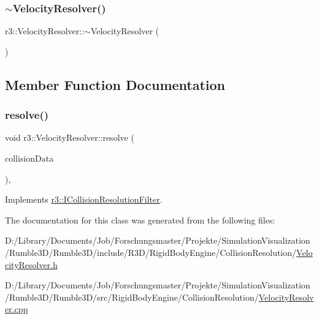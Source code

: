 \subsubsection{\texorpdfstring{$\sim$\+Velocity\+Resolver()}{~VelocityResolver()}}
{\footnotesize\ttfamily r3\+::\+Velocity\+Resolver\+::$\sim$\+Velocity\+Resolver (\begin{DoxyParamCaption}{ }\end{DoxyParamCaption})\hspace{0.3cm}{\ttfamily [default]}}



\subsection{Member Function Documentation}
\mbox{\label{classr3_1_1_velocity_resolver_ad3fa33c02dfa07c760ca9bc5c89f49c3}} 
\subsubsection{\texorpdfstring{resolve()}{resolve()}}
{\footnotesize\ttfamily void r3\+::\+Velocity\+Resolver\+::resolve (\begin{DoxyParamCaption}\item[{const \mbox{\hyperlink{classr3_1_1_collision_data}{Collision\+Data}} \&}]{collision\+Data }\end{DoxyParamCaption})\hspace{0.3cm}{\ttfamily [override]}, {\ttfamily [virtual]}}



Implements \mbox{\hyperlink{classr3_1_1_i_collision_resolution_filter_a9ae35c07c585500c409459ef87e5ae15}{r3\+::\+I\+Collision\+Resolution\+Filter}}.



The documentation for this class was generated from the following files\+:\begin{DoxyCompactItemize}
\item 
D\+:/\+Library/\+Documents/\+Job/\+Forschungsmaster/\+Projekte/\+Simulation\+Visualization/\+Rumble3\+D/\+Rumble3\+D/include/\+R3\+D/\+Rigid\+Body\+Engine/\+Collision\+Resolution/\mbox{\hyperlink{_velocity_resolver_8h}{Velocity\+Resolver.\+h}}\item 
D\+:/\+Library/\+Documents/\+Job/\+Forschungsmaster/\+Projekte/\+Simulation\+Visualization/\+Rumble3\+D/\+Rumble3\+D/src/\+Rigid\+Body\+Engine/\+Collision\+Resolution/\mbox{\hyperlink{_velocity_resolver_8cpp}{Velocity\+Resolver.\+cpp}}\end{DoxyCompactItemize}
